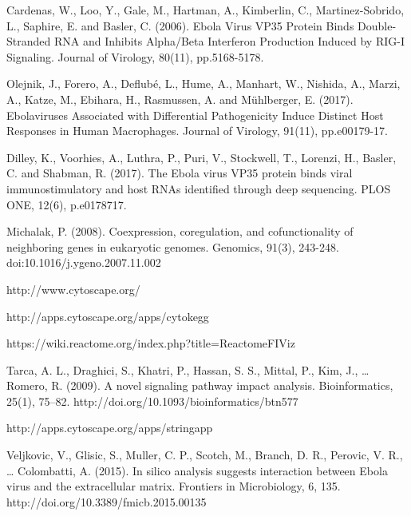 \documentclass[twocolumn]{article}
\begin{document}
\begin{thebibliography}{9}
	Cardenas, W., Loo, Y., Gale, M., Hartman, A., Kimberlin, C., Martinez-Sobrido, L., Saphire, E. and Basler, C. (2006). Ebola Virus VP35 Protein Binds Double-Stranded RNA and Inhibits Alpha/Beta Interferon Production Induced by RIG-I Signaling. Journal of Virology, 80(11), pp.5168-5178.
	
	Olejnik, J., Forero, A., Deflubé, L., Hume, A., Manhart, W., Nishida, A., Marzi, A., Katze, M., Ebihara, H., Rasmussen, A. and Mühlberger, E. (2017). Ebolaviruses Associated with Differential Pathogenicity Induce Distinct Host Responses in Human Macrophages. Journal of Virology, 91(11), pp.e00179-17.
	
	Dilley, K., Voorhies, A., Luthra, P., Puri, V., Stockwell, T., Lorenzi, H., Basler, C. and Shabman, R. (2017). The Ebola virus VP35 protein binds viral immunostimulatory and host RNAs identified through deep sequencing. PLOS ONE, 12(6), p.e0178717.
	

	Michalak, P. (2008). Coexpression, coregulation, and cofunctionality of neighboring genes in eukaryotic genomes. Genomics, 91(3), 243-248. doi:10.1016/j.ygeno.2007.11.002 
	
	http://www.cytoscape.org/
	
	http://apps.cytoscape.org/apps/cytokegg
	
	https://wiki.reactome.org/index.php?title=ReactomeFIViz
	
	Tarca, A. L., Draghici, S., Khatri, P., Hassan, S. S., Mittal, P., Kim, J., … Romero, R. (2009). A novel signaling pathway impact analysis. Bioinformatics, 25(1), 75–82. http://doi.org/10.1093/bioinformatics/btn577
	
	http://apps.cytoscape.org/apps/stringapp
	
	Veljkovic, V., Glisic, S., Muller, C. P., Scotch, M., Branch, D. R., Perovic, V. R., … Colombatti, A. (2015). In silico analysis suggests interaction between Ebola virus and the extracellular matrix. Frontiers in Microbiology, 6, 135. http://doi.org/10.3389/fmicb.2015.00135
	
	
\end{thebibliography}
\end{document}
